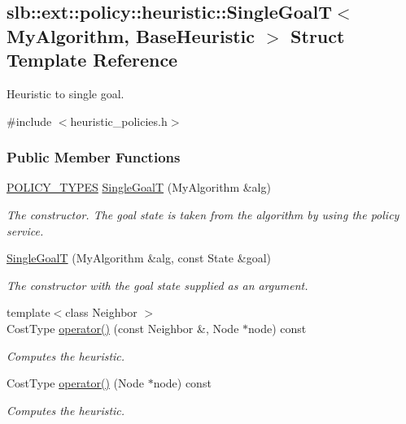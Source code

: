 \hypertarget{structslb_1_1ext_1_1policy_1_1heuristic_1_1SingleGoalT}{}\subsection{slb\+:\+:ext\+:\+:policy\+:\+:heuristic\+:\+:Single\+GoalT$<$ My\+Algorithm, Base\+Heuristic $>$ Struct Template Reference}
\label{structslb_1_1ext_1_1policy_1_1heuristic_1_1SingleGoalT}


Heuristic to single goal.  




{\ttfamily \#include $<$heuristic\+\_\+policies.\+h$>$}

\subsubsection*{Public Member Functions}
\begin{DoxyCompactItemize}
\item 
\hyperlink{extensions_2shared__policies_2headers_8h_ae70a06fa4631780beea14971eb36a562}{P\+O\+L\+I\+C\+Y\+\_\+\+T\+Y\+P\+ES} \hyperlink{structslb_1_1ext_1_1policy_1_1heuristic_1_1SingleGoalT_a5bd9a7d38cec87c422abe9f7e08d3fe6}{Single\+GoalT} (My\+Algorithm \&alg)
\begin{DoxyCompactList}\small\item\em The constructor. The goal state is taken from the algorithm by using the policy service. \end{DoxyCompactList}\item 
\hyperlink{structslb_1_1ext_1_1policy_1_1heuristic_1_1SingleGoalT_a109419aa94dffc9359b338acb06bba8d}{Single\+GoalT} (My\+Algorithm \&alg, const State \&goal)
\begin{DoxyCompactList}\small\item\em The constructor with the goal state supplied as an argument. \end{DoxyCompactList}\item 
{\footnotesize template$<$class Neighbor $>$ }\\Cost\+Type \hyperlink{structslb_1_1ext_1_1policy_1_1heuristic_1_1SingleGoalT_a9a5a37acd02a84a619ac27ce1142b8c2}{operator()} (const Neighbor \&, Node $\ast$node) const 
\begin{DoxyCompactList}\small\item\em Computes the heuristic. \end{DoxyCompactList}\item 
Cost\+Type \hyperlink{structslb_1_1ext_1_1policy_1_1heuristic_1_1SingleGoalT_aa77977fc0c95f3fc79a9c35c9f2c5179}{operator()} (Node $\ast$node) const 
\begin{DoxyCompactList}\small\item\em Computes the heuristic. \end{DoxyCompactList}\end{DoxyCompactItemize}
